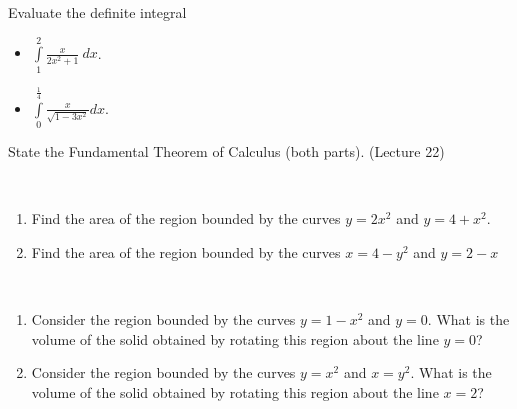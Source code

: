 \documentclass{article}
\begin{document}
\begin{problem}
Evaluate the definite integral 
\begin{itemize}
\item $\displaystyle\int\limits_{1}^{2} \frac{x}{2x^2+1 }  ~dx$.
\item $\displaystyle\int\limits_{0}^{\frac{1}4}\frac{x }{\sqrt{1-3x^2}}dx$.

\end{itemize}
\end{problem}
\begin{problem}
State the Fundamental Theorem of Calculus (both parts). (Lecture 22)
\end{problem}
\begin{problem}~
\begin{enumerate}
\item Find the area of the region bounded by the curves $y = 2x^2$ and $y = 4 + x^2$.

\item Find the area of the region bounded by the curves $x = 4 - y^2$ and $y = 2 - x$

\end{enumerate}
\end{problem}
\begin{problem}~
\begin{enumerate}
\item Consider the region bounded by the curves $y = 1-x^2$ and $y =0$. What is the volume of the solid obtained by
rotating this region about the line $y = 0$?

\item Consider the region bounded by the curves $y = x^2$ and $x = y^2$. What is the volume of the solid obtained by
rotating this region about the line $x = 2$?

\end{enumerate}
\end{problem}
\end{document}
